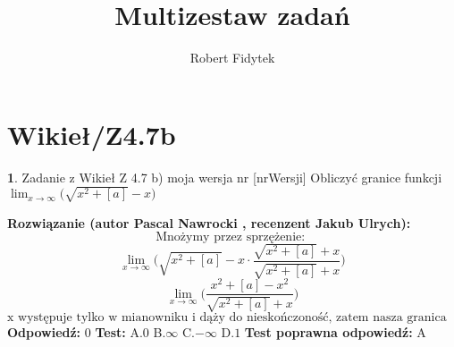 \documentclass[12pt, a4paper]{article}
\title{Multizestaw zadań}
\author{Robert Fidytek}
\date{}
\theoremstyle{definition} %
\newtheorem{zad}{}
\newcommand{\kategoria}[1]{\section{#1}} %
\newcommand{\zadStart}[1]{\begin{zad}#1\newline} %
\newcommand{\zadStop}{\end{zad}}   %
\newcommand{\rozwStart}[2]{\noindent \textbf{Rozwiązanie (autor #1 , recenzent #2): }\newline} %
\newcommand{\rozwStop}{\newline}                                            %
\newcommand{\odpStart}{\noindent \textbf{Odpowiedź:}\newline}    %
\newcommand{\odpStop}{\newline}                                             %
\newcommand{\testStart}{\noindent \textbf{Test:}\newline} %
\newcommand{\testStop}{\newline} %
\newcommand{\kluczStart}{\noindent \textbf{Test poprawna odpowiedź:}\newline} %
\newcommand{\kluczStop}{\newline} %
\begin{document}
\maketitle


\kategoria{Wikieł/Z4.7b}
\zadStart{Zadanie z Wikieł Z 4.7 b) moja wersja nr [nrWersji]}
Obliczyć granice funkcji $\displaystyle{\lim_{x \to \infty}}\big(\sqrt{x^2+[a]}-x\big)$
\zadStop
\rozwStart{Pascal Nawrocki}{Jakub Ulrych}
$$\text{Mnożymy przez sprzężenie: }$$
$$\displaystyle{\lim_{x \to \infty}}\big(\sqrt{x^2+[a]}-x\cdot\frac{\sqrt{x^2+[a]}+x}{\sqrt{x^2+[a]}+x}\big)$$
$$\displaystyle{\lim_{x \to \infty}}\big(\frac{x^2+[a]-x^2}{\sqrt{x^2+[a]}+x}\big)$$
$$\text{x występuje tylko w mianowniku i dąży do nieskończoność, zatem nasza granica równa jest 0.}$$
\rozwStop
\odpStart
$0$
\odpStop
\testStart
A.$0$
B.$\infty$
C.$-\infty$
D.$1$
\testStop
\kluczStart
A
\kluczStop
\end{document}
